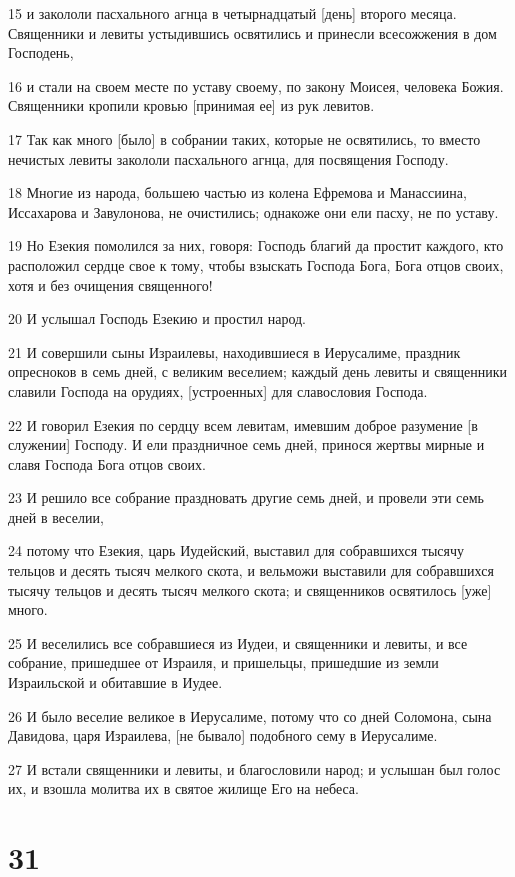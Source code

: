 \par 15 и закололи пасхального агнца в четырнадцатый [день] второго месяца. Священники и левиты устыдившись освятились и принесли всесожжения в дом Господень,
\par 16 и стали на своем месте по уставу своему, по закону Моисея, человека Божия. Священники кропили кровью [принимая ее] из рук левитов.
\par 17 Так как много [было] в собрании таких, которые не освятились, то вместо нечистых левиты закололи пасхального агнца, для посвящения Господу.
\par 18 Многие из народа, большею частью из колена Ефремова и Манассиина, Иссахарова и Завулонова, не очистились; однакоже они ели пасху, не по уставу.
\par 19 Но Езекия помолился за них, говоря: Господь благий да простит каждого, кто расположил сердце свое к тому, чтобы взыскать Господа Бога, Бога отцов своих, хотя и без очищения священного!
\par 20 И услышал Господь Езекию и простил народ.
\par 21 И совершили сыны Израилевы, находившиеся в Иерусалиме, праздник опресноков в семь дней, с великим веселием; каждый день левиты и священники славили Господа на орудиях, [устроенных] для славословия Господа.
\par 22 И говорил Езекия по сердцу всем левитам, имевшим доброе разумение [в служении] Господу. И ели праздничное семь дней, принося жертвы мирные и славя Господа Бога отцов своих.
\par 23 И решило все собрание праздновать другие семь дней, и провели эти семь дней в веселии,
\par 24 потому что Езекия, царь Иудейский, выставил для собравшихся тысячу тельцов и десять тысяч мелкого скота, и вельможи выставили для собравшихся тысячу тельцов и десять тысяч мелкого скота; и священников освятилось [уже] много.
\par 25 И веселились все собравшиеся из Иудеи, и священники и левиты, и все собрание, пришедшее от Израиля, и пришельцы, пришедшие из земли Израильской и обитавшие в Иудее.
\par 26 И было веселие великое в Иерусалиме, потому что со дней Соломона, сына Давидова, царя Израилева, [не бывало] подобного сему в Иерусалиме.
\par 27 И встали священники и левиты, и благословили народ; и услышан был голос их, и взошла молитва их в святое жилище Его на небеса.

\chapter{31}


